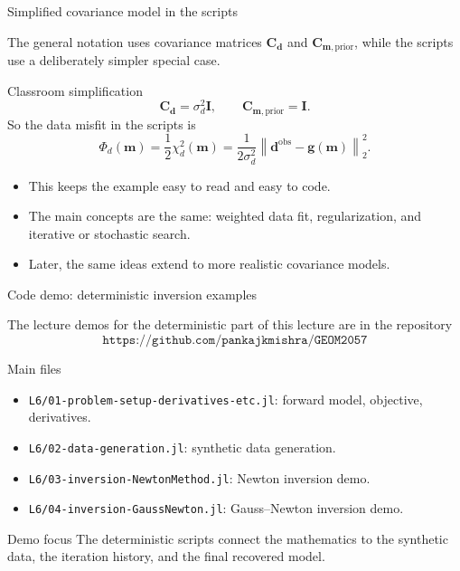 \documentclass[aspectratio=169]{beamer}
\newcommand{\mat}[1]{{\mathbf{#1}}}
\renewcommand{\vec}[1]{\mathbf{#1}}
\newcommand{\dd}{ {\vec{d}} }
\newcommand{\dobs}{{\vec{d}^{\text{obs}}}}
\newcommand{\mm}{ {\vec{m}} }
\renewcommand{\gg}[1]{\vec{g}\left(#1\right)}
\newcommand{\II}{\mat{I}}
\newcommand{\Cd}{\mat{C}_{\dd}}
\newcommand{\Cm}{\mat{C}_{\mm,\text{prior}}}
\newcommand{\courserepo}{\texttt{https://github.com/pankajkmishra/GEOM2057}}
\begin{document}
\begin{frame}{Simplified covariance model in the scripts}
\small

The general notation uses covariance matrices $\Cd$ and $\Cm$, while the scripts use a deliberately simpler special case.

\begin{alertblock}{Classroom simplification}
\[
\Cd = \sigma_d^2 \II,
\qquad
\Cm = \II.
\]
So the data misfit in the scripts is
\[
\Phi_d(\mm)
=
\frac{1}{2}\chi_d^2(\mm)
=
\frac{1}{2\sigma_d^2}\left\|\dobs-\gg{\mm}\right\|_2^2.
\]
\end{alertblock}

\begin{itemize}
    \item[--] This keeps the example easy to read and easy to code.
    \item[--] The main concepts are the same: weighted data fit, regularization, and iterative or stochastic search.
    \item[--] Later, the same ideas extend to more realistic covariance models.
\end{itemize}
\end{frame}

\begin{frame}{Code demo: deterministic inversion examples}
\small

The lecture demos for the deterministic part of this lecture are in the repository
\[
\courserepo
\]

\begin{block}{Main files}
\begin{itemize}
    \item[--] \texttt{L6/01-problem-setup-derivatives-etc.jl}: forward model, objective, derivatives.
    \item[--] \texttt{L6/02-data-generation.jl}: synthetic data generation.
    \item[--] \texttt{L6/03-inversion-NewtonMethod.jl}: Newton inversion demo.
    \item[--] \texttt{L6/04-inversion-GaussNewton.jl}: Gauss--Newton inversion demo.
\end{itemize}
\end{block}

\begin{alertblock}{Demo focus}
The deterministic scripts connect the mathematics to the synthetic data, the iteration history, and the final recovered model.
\end{alertblock}
\end{frame}
\end{document}
